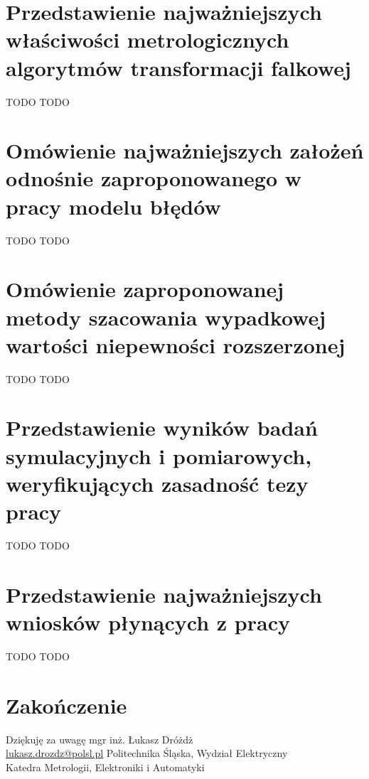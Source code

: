\documentclass[12pt, polish]{beamer}
\begin{document}
\section{Przedstawienie najważniejszych właściwości metrologicznych algorytmów transformacji falkowej}

\begin{frame}{TODO}
TODO
\end{frame}

\section{Omówienie najważniejszych założeń odnośnie zaproponowanego w pracy modelu błędów}

\begin{frame}{TODO}
TODO
\end{frame}

\section{Omówienie zaproponowanej metody szacowania wypadkowej wartości niepewności rozszerzonej}

\begin{frame}{TODO}
TODO
\end{frame}

\section{Przedstawienie wyników badań symulacyjnych i pomiarowych, weryfikujących zasadność tezy pracy}

\begin{frame}{TODO}
TODO
\end{frame}

\section{Przedstawienie najważniejszych wniosków płynących z pracy}

\begin{frame}{TODO}
TODO
\end{frame}

\section*{Zakończenie}

\begin{frame}{Dziękuję za uwagę}
\centering
mgr inż. Łukasz Dróżdż \\ \href{mailto:lukasz.drozdz@polsl.pl}{lukasz.drozdz@polsl.pl}
\vskip 16pt
Politechnika Śląska, Wydział Elektryczny \\ Katedra Metrologii, Elektroniki i Automatyki
\end{frame}
\end{document}

